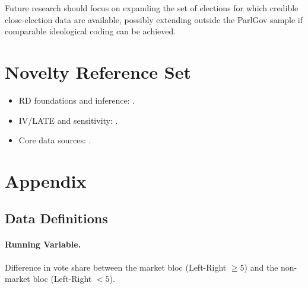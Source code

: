 \documentclass[12pt,a4paper]{article}
\begin{document}
Future research should focus on expanding the set of elections for which 
credible close-election data are available, possibly extending outside 
the ParlGov sample if comparable ideological coding can be achieved.


\section*{Novelty Reference Set}
\begin{itemize}[leftmargin=1.5em]
\item RD foundations and inference: \citep{lee2008randomized,calonico2014robust,cattaneo2015randomization}.
\item IV/LATE and sensitivity: \citep{imbens1994identification,conley2012plausibly}.
\item Core data sources: \citep{gwartney2025efw,clea2025,doring2021parlgov,dpi2020,vdem2025,vparty2024,worldbankwdi,pwt11}.
\end{itemize}


\newpage




\newpage
\appendix
\section{Appendix}

\subsection{Data Definitions}

\paragraph{Running Variable.}
Difference in vote share between the market bloc (Left-Right $\geq 5$) 
and the non-market bloc (Left-Right $< 5$).
\end{document}
